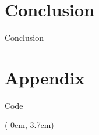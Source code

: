 \documentclass[8pt]{beamer}
\begin{document}
\section{Conclusion}

\begin{frame}{Conclusion}
	
	
\end{frame}



\appendix
\section{Appendix}
\begin{frame}{Code}


\lstset{language=Python}
\lstset{basicstyle=\normalsize}

\begin{textblock*}{\textwidth}(-0cm,-3.7cm)
	
	
	
	
\end{textblock*}


\end{frame}
\end{document}
